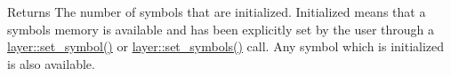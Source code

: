 \begin{DoxyReturn}{Returns}
The number of symbols that are initialized. Initialized means that a symbols memory is available and has been explicitly set by the user through a \hyperlink{group__storage__api_ga7f79fae19b4a2fd73d4c2c3c5be1ff7f}{layer\-::set\-\_\-symbol()} or \hyperlink{group__storage__api_gac90a4ce8eb50126267d92059c9e3b1a5}{layer\-::set\-\_\-symbols()} call. Any symbol which is initialized is also available. 
\end{DoxyReturn}
